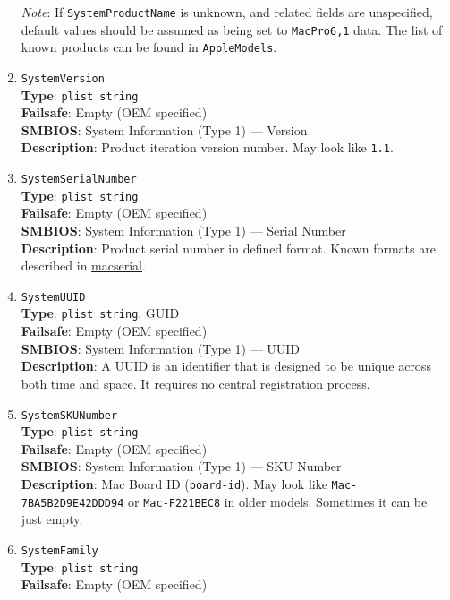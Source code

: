 \documentclass[]{article}
\begin{document}
\begin{enumerate}
  \emph{Note}: If \texttt{SystemProductName} is unknown, and related
  fields are unspecified, default values should be assumed as being set
  to \texttt{MacPro6,1} data. The list of known products can be found in
  \texttt{AppleModels}.
\item
  \texttt{SystemVersion}\\
  \textbf{Type}: \texttt{plist\ string}\\
  \textbf{Failsafe}: Empty (OEM specified)\\
  \textbf{SMBIOS}: System Information (Type 1) --- Version\\
  \textbf{Description}: Product iteration version number. May look like
  \texttt{1.1}.
\item
  \texttt{SystemSerialNumber}\\
  \textbf{Type}: \texttt{plist\ string}\\
  \textbf{Failsafe}: Empty (OEM specified)\\
  \textbf{SMBIOS}: System Information (Type 1) --- Serial Number\\
  \textbf{Description}: Product serial number in defined format. Known
  formats are described in
  \href{https://github.com/acidanthera/OpenCorePkg/blob/master/Utilities/macserial/FORMAT.md}{macserial}.
\item
  \texttt{SystemUUID}\\
  \textbf{Type}: \texttt{plist\ string}, GUID\\
  \textbf{Failsafe}: Empty (OEM specified)\\
  \textbf{SMBIOS}: System Information (Type 1) --- UUID\\
  \textbf{Description}: A UUID is an identifier that is designed to be
  unique across both time and space. It requires no central registration
  process.
\item
  \texttt{SystemSKUNumber}\\
  \textbf{Type}: \texttt{plist\ string}\\
  \textbf{Failsafe}: Empty (OEM specified)\\
  \textbf{SMBIOS}: System Information (Type 1) --- SKU Number\\
  \textbf{Description}: Mac Board ID (\texttt{board-id}). May look like
  \texttt{Mac-7BA5B2D9E42DDD94} or \texttt{Mac-F221BEC8} in older
  models. Sometimes it can be just empty.
\item
  \texttt{SystemFamily}\\
  \textbf{Type}: \texttt{plist\ string}\\
  \textbf{Failsafe}: Empty (OEM specified)\\

\end{enumerate}
\end{document}
